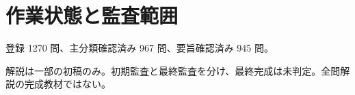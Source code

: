 \chapter{作業状態と監査範囲}
登録 1270 問、主分類確認済み 967 問、要旨確認済み 945 問。
\par 解説は一部の初稿のみ。初期監査と最終監査を分け、最終完成は未判定。全問解説の完成教材ではない。
